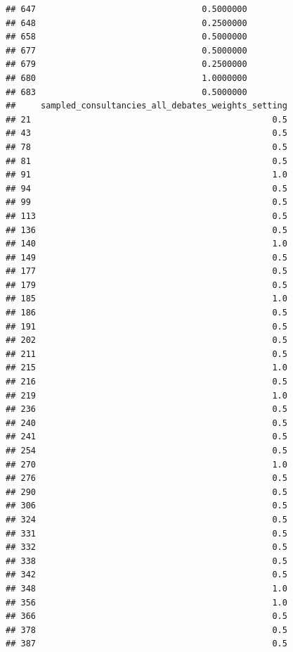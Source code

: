 \documentclass[
]{article}
\begin{document}
\begin{verbatim}
## 647                                 0.5000000
## 648                                 0.2500000
## 658                                 0.5000000
## 677                                 0.5000000
## 679                                 0.2500000
## 680                                 1.0000000
## 683                                 0.5000000
##     sampled_consultancies_all_debates_weights_setting
## 21                                                0.5
## 43                                                0.5
## 78                                                0.5
## 81                                                0.5
## 91                                                1.0
## 94                                                0.5
## 99                                                0.5
## 113                                               0.5
## 136                                               0.5
## 140                                               1.0
## 149                                               0.5
## 177                                               0.5
## 179                                               0.5
## 185                                               1.0
## 186                                               0.5
## 191                                               0.5
## 202                                               0.5
## 211                                               0.5
## 215                                               1.0
## 216                                               0.5
## 219                                               1.0
## 236                                               0.5
## 240                                               0.5
## 241                                               0.5
## 254                                               0.5
## 270                                               1.0
## 276                                               0.5
## 290                                               0.5
## 306                                               0.5
## 324                                               0.5
## 331                                               0.5
## 332                                               0.5
## 338                                               0.5
## 342                                               0.5
## 348                                               1.0
## 356                                               1.0
## 366                                               0.5
## 378                                               0.5
## 387                                               0.5

\end{verbatim}
\end{document}
